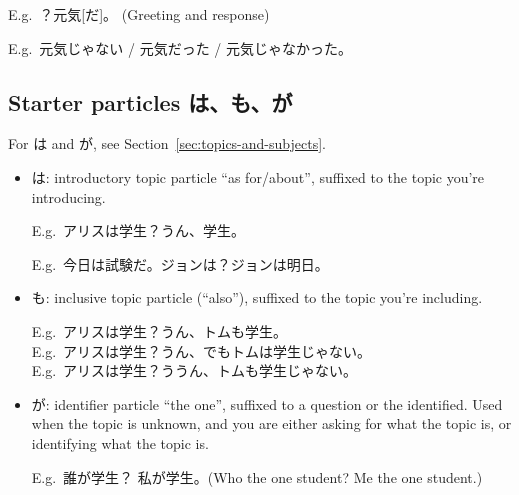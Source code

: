 \documentclass[../nihongo-gakushuu-kyouzai.tex]{subfiles}
\begin{document}
E.g.\ ？元気[だ]。 (Greeting and response)

E.g.\ 元気じゃない / 元気だった / 元気じゃなかった。

\subsection{Starter particles は、も、が} \label{sec:particles}
For は and が, see Section~\ref{sec:topics-and-subjects}.
\begin{itemize}
    \item は: introductory topic particle ``as for/about'', suffixed to the topic you're introducing.

    E.g.\ アリスは学生？うん、学生。

    E.g.\ 今日は試験だ。ジョンは？ジョンは明日。
    \item も: inclusive topic particle (``also''), suffixed to the topic you're including.

    E.g.\ アリスは学生？うん、トムも学生。\\
    E.g.\ アリスは学生？うん、でもトムは学生じゃない。\\
    E.g.\ アリスは学生？ううん、トムも学生じゃない。
    \item が: identifier particle ``the one'', suffixed to a question or the identified. Used when the topic is unknown, and you are either asking for what the topic is, or identifying what the topic is.

    E.g.\ 誰が学生？ 私が学生。(Who the one student? Me the one student.)\\
\end{itemize}
\end{document}
